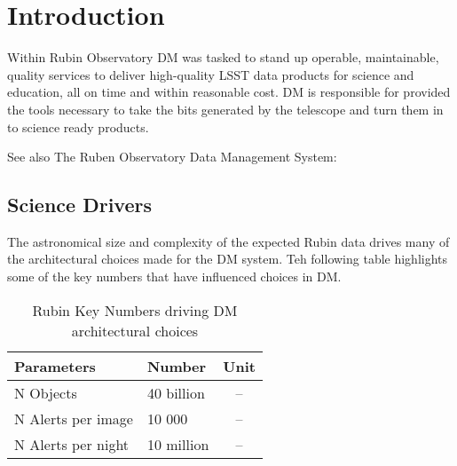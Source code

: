 \section{Introduction}

Within Rubin Observatory DM was tasked to stand up operable, maintainable, quality services to deliver high-quality LSST data products for science and education, all on time and within reasonable cost.
DM is responsible for provided the tools necessary to take the bits generated by the telescope and turn them in to science ready products.

 See also The Ruben Observatory  Data Management System: \cite{2015arXiv151207914J}


\subsection{Science Drivers}
The astronomical size and complexity of the expected Rubin data drives many of the architectural choices made for the DM system. Teh following table highlights some of the key numbers that have influenced choices in DM.

\begin{table}[ht]
\caption{Rubin Key Numbers driving DM architectural choices}
\label{tab:dm_keynumbers}
\begin{center}
\begin{tabular}{|l|l|c|} %

\hline
\rule[-1ex]{0pt}{3.5ex}  {\bf Parameters} & {\bf Number} & {\bf Unit}\\
\hline
N Objects & 40 billion & -- \\
N Alerts per image & 10 000 & -- \\
N Alerts per night & 10 million & -- \\
\hline
\end{tabular}
\end{center}
\end{table}

